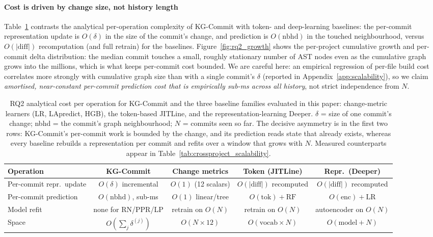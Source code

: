 \documentclass[final,5p,times,twocolumn]{elsarticle}
\theoremstyle{plain}
\begin{document}
\paragraph{Cost is driven by change size, not history length}
Table~\ref{tab:complexity_analytical} contrasts the analytical per-operation complexity of KG-Commit
with token- and deep-learning baselines: the per-commit representation update is
$O(\delta)$ in the size of the commit's change, and prediction is $O(\mathrm{nbhd})$ in
the touched neighbourhood, versus $O(|\mathrm{diff}|)$ recomputation (and full retrain)
for the baselines. Figure~\ref{fig:rq2_growth} shows the per-project cumulative growth
and per-commit delta distribution: the median commit touches a small, roughly stationary
number of AST nodes even as the cumulative graph grows into the millions, which is what
keeps per-commit cost bounded. We are careful here: an empirical regression of per-file
build cost correlates more strongly with cumulative graph size than with a single
commit's $\delta$ (reported in Appendix~\ref{app:scalability}), so we claim
\emph{amortised, near-constant per-commit prediction cost that is empirically sub-ms
across all history}, not strict independence from $N$.

\begin{table}[t]\centering\small\setlength{\tabcolsep}{6pt}
\caption{RQ2 analytical cost per operation for KG-Commit and the three baseline families evaluated in this paper: change-metric learners (LR, LApredict, HGB), the token-based JITLine, and the representation-learning Deeper. $\delta$ = size of one commit's change; nbhd = the commit's graph neighbourhood; $N$ = commits seen so far. The decisive asymmetry is in the first two rows: KG-Commit's per-commit work is bounded by the change, and its prediction reads state that already exists, whereas every baseline rebuilds a representation per commit and refits over a window that grows with $N$. Measured counterparts appear in Table~\ref{tab:crossproject_scalability}.}
\label{tab:complexity_analytical}
\begin{tabular}{lcccc}
\toprule
Operation & KG-Commit & Change metrics & Token (JITLine) & Repr.\ (Deeper) \\ \midrule
Per-commit repr.\ update & $O(\delta)$ incremental & $O(1)$ (12 scalars) & $O(|\text{diff}|)$ recomputed & $O(|\text{diff}|)$ recomputed \\
Per-commit prediction & $O(\text{nbhd})$, sub-ms & $O(1)$ linear/tree & $O(\text{tok})+\text{RF}$ & $O(\text{enc})+\text{LR}$ \\
Model refit & none for RN/PPR/LP & retrain on $O(N)$ & retrain on $O(N)$ & autoencoder on $O(N)$ \\
Space & $O(\sum_j \delta^{(j)})$ & $O(N\!\times\!12)$ & $O(\text{vocab}\!\times\!N)$ & $O(\text{model}+N)$ \\
\bottomrule
\end{tabular}
\end{table}
\end{document}
